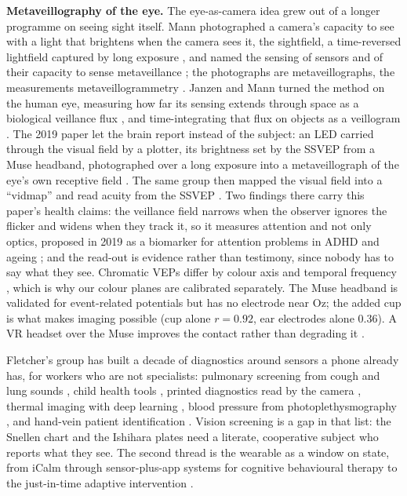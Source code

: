 \documentclass[conference]{IEEEtran}
\newif\ifnotes \notesfalse
\newcommand{\rf}[1]{\ifnotes\textcolor{blue}{[RF: #1]}\fi}
\begin{document}
\textbf{Metaveillography of the eye.} The eye-as-camera idea grew out of a longer programme on seeing sight itself. Mann photographed a camera's capacity to see with a light that brightens when the camera sees it, the sightfield, a time-reversed lightfield captured by long exposure \cite{mann2014sightfield}, and named the sensing of sensors and of their capacity to sense metaveillance \cite{mann2016metaveillance}; the photographs are metaveillographs, the measurements metaveillogrammetry \cite{mann2021drones}. Janzen and Mann turned the method on the human eye, measuring how far its sensing extends through space as a biological veillance flux \cite{janzen2014veillance, janzen2015veillametrics}, and time-integrating that flux on objects as a veillogram \cite{janzen2018painting}. The 2019 paper let the brain report instead of the subject: an LED carried through the visual field by a plotter, its brightness set by the SSVEP from a Muse headband, photographed over a long exposure into a metaveillograph of the eye's own receptive field \cite{mann2019eye, mann2019wearsys}. The same group then mapped the visual field into a ``vidmap'' \cite{garcia2020painting} and read acuity from the SSVEP \cite{garcia2021acuity}. Two findings there carry this paper's health claims: the veillance field narrows when the observer ignores the flicker and widens when they track it, so it measures attention and not only optics, proposed in 2019 as a biomarker for attention problems in ADHD and ageing \cite{mann2019eye}; and the read-out is evidence rather than testimony, since nobody has to say what they see. Chromatic VEPs differ by colour axis and temporal frequency \cite{rabin1994chromatic}, which is why our colour planes are calibrated separately. The Muse headband is validated for event-related potentials \cite{krigolson2017muse} but has no electrode near Oz; the added cup is what makes imaging possible (cup alone $r = 0.92$, ear electrodes alone 0.36). A VR headset over the Muse improves the contact rather than degrading it \cite{mann2026float}.

Fletcher's group has built a decade of diagnostics around sensors a phone already has, for workers who are not specialists: pulmonary screening from cough and lung sounds \cite{chamberlain2016asthma, infante2017cough, anand2018pulmonary}, child health tools \cite{fletcher2017child}, printed diagnostics read by the camera \cite{fletcher2016printed}, thermal imaging with deep learning \cite{fletcher2021thermal, byun2021thermal}, blood pressure from photoplethysmography \cite{elgendi2019ppg}, and hand-vein patient identification \cite{fletcher2014vein}. Vision screening is a gap in that list: the Snellen chart and the Ishihara plates need a literate, cooperative subject who reports what they see. \rf{where vision screening sits in a community health worker's day} The second thread is the wearable as a window on state, from iCalm \cite{fletcher2010icalm} through sensor-plus-app systems for cognitive behavioural therapy \cite{fletcher2011cbt, boyer2012iheal, leonard2018homeless} to the just-in-time adaptive intervention \cite{nahum2018jitai}. \rf{JITAI framing}
\end{document}
